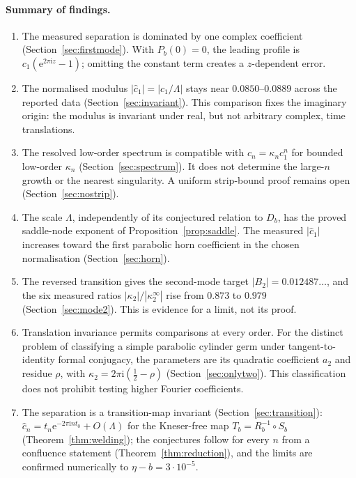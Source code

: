 \documentclass[11pt,a4paper]{article}
\theoremstyle{definition}
\newcommand{\Rr}{R}
\newcommand{\eee}{\mathrm{e}}
\newcommand{\ii}{\mathrm{i}}
\begin{document}
\paragraph{Summary of findings.}
\begin{enumerate}
\item The measured separation is dominated by one complex coefficient
  (Section~\ref{sec:firstmode}).  With $P_b(0)=0$, the leading profile is
  $c_1(\eee^{2\pi\ii z}-1)$; omitting the constant term creates a
  $z$-dependent error.
\item The normalised modulus $|\hat c_1|=|c_1/\Lambda|$ stays near
  $0.0850$--$0.0889$ across the reported data (Section~\ref{sec:invariant}).
  This comparison fixes the imaginary origin: the modulus is invariant under
  real, but not arbitrary complex, time translations.
\item The resolved low-order spectrum is compatible with
  $c_n=\kappa_n c_1^n$ for bounded low-order $\kappa_n$
  (Section~\ref{sec:spectrum}).  It does not determine the large-$n$ growth
  or the nearest singularity.  A uniform strip-bound proof remains open
  (Section~\ref{sec:nostrip}).
\item The scale $\Lambda$, independently of its conjectured relation to $D_b$,
  has the proved saddle-node exponent of Proposition~\ref{prop:saddle}.
  The measured $|\hat c_1|$ increases toward the first parabolic horn
  coefficient in the chosen normalisation (Section~\ref{sec:horn}).
\item The reversed transition gives the second-mode target
  $|B_2|=0.012487\ldots$, and the six measured ratios
  $|\kappa_2|/|\kappa_2^\infty|$ rise from $0.873$ to $0.979$
  (Section~\ref{sec:mode2}).  This is evidence for a limit, not its proof.
\item Translation invariance permits comparisons at every order.  For the
  distinct problem of classifying a simple parabolic cylinder germ under
  tangent-to-identity formal conjugacy, the parameters are its quadratic
  coefficient $a_2$ and residue $\rho$, with
  $\kappa_2=2\pi\ii(\frac12-\rho)$ (Section~\ref{sec:onlytwo}).
  This classification does not prohibit testing higher Fourier coefficients.
\item The separation is a transition-map invariant (Section~\ref{sec:transition}):
  $\hat c_n=t_n\eee^{-2\pi\ii nt_0}+O(\Lambda)$ for the Kneser-free map
  $T_b=\Rr_b^{-1}\circ S_b$ (Theorem~\ref{thm:welding}); the conjectures follow for
  every $n$ from a confluence statement (Theorem~\ref{thm:reduction}), and the
  limits are confirmed numerically to $\eta-b=3\cdot10^{-5}$.
\end{enumerate}
\end{document}
